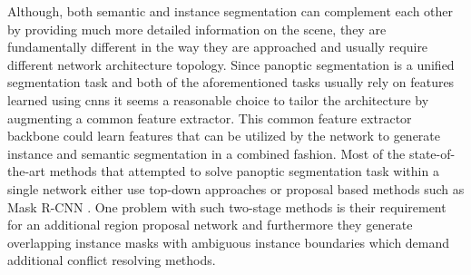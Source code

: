 Although, both semantic and instance segmentation can complement each other by providing much more detailed information on the scene, they are fundamentally different in the way they are approached and usually require different network architecture topology. Since panoptic segmentation is a unified segmentation task and both of the aforementioned tasks usually rely on features learned using \gls{cnns} it seems a reasonable choice to tailor the architecture by augmenting a common feature extractor. This common feature extractor backbone could learn features that can be utilized by the network to generate instance and semantic segmentation in a combined fashion. Most of the state-of-the-art methods that attempted to solve panoptic segmentation task within a single network either use top-down approaches or proposal based methods such as Mask R-CNN \cite{He2017}. One problem with such two-stage methods is their requirement for an additional region proposal network and furthermore they generate overlapping instance masks with ambiguous instance boundaries which demand additional conflict resolving methods.

